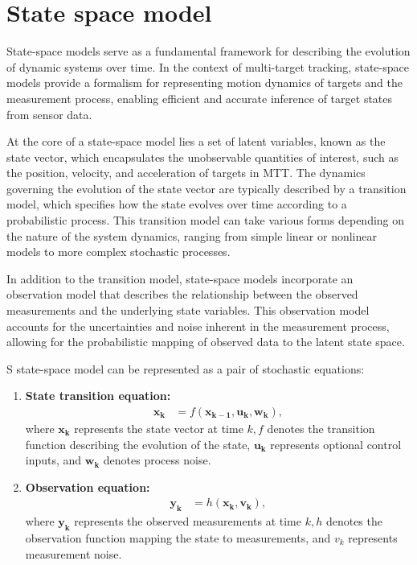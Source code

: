     
    \section{State space model}
\label{sec:stateSpaceModel}
State-space models serve as a fundamental framework for describing the evolution of dynamic systems over time. In the context of multi-target tracking, state-space models provide a formalism for representing motion dynamics of targets and the measurement process, enabling efficient and accurate inference of target states from sensor data.

At the core of a state-space model lies a set of latent variables, known as the state vector, which encapsulates the unobservable quantities of interest, such as the position, velocity, and acceleration of targets in MTT. The dynamics governing the evolution of the state vector are typically described by a transition model, which specifies how the state evolves over time according to a probabilistic process. This transition model can take various forms depending on the nature of the system dynamics, ranging from simple linear or nonlinear models to more complex stochastic processes.

In addition to the transition model, state-space models incorporate an observation model that describes the relationship between the observed measurements and the underlying state variables. This observation model accounts for the uncertainties and noise inherent in the measurement process, allowing for the probabilistic mapping of observed data to the latent state space.

S state-space model can be represented as a pair of stochastic equations:
\begin{enumerate}
    \item \textbf{State transition equation:}
        \begin{align}
                  \mathbf{x_k} &= f(\mathbf{x_{k-1}}, \mathbf{u_k}, \mathbf{w_k}),
        \end{align}
        where $\mathbf{x_k}$ represents the state vector at time $k, f$ denotes the transition function describing the
        evolution of the state, $\mathbf{u_k}$ represents optional control inputs, and $\mathbf{w_k}$ denotes process
    noise.
    \item \textbf{Observation equation:}
        \begin{align}
            \mathbf{y_k} &= h(\mathbf{x_{k}}, \mathbf{v_k}),
        \end{align}
        where $\mathbf{y_k}$ represents the observed measurements at time $k, h$ denotes the observation function
    mapping the
    state to measurements, and $v_k$ represents measurement noise.
\end{enumerate}

